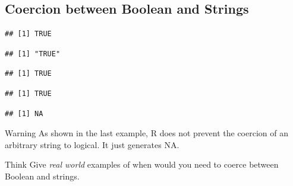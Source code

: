 \subsection{Coercion between Boolean and Strings}
\begin{knitrout}
\color{fgcolor}\begin{kframe}
\begin{alltt}
\hlstd{(}\hlstd{)} 
\end{alltt}
\begin{verbatim}
## [1] TRUE
\end{verbatim}
\begin{alltt}
\hlstd{(}\hlstd{)} 
\end{alltt}
\begin{verbatim}
## [1] "TRUE"
\end{verbatim}
\begin{alltt}
\hlstd{(}\hlstd{)}  
\end{alltt}
\begin{verbatim}
## [1] TRUE
\end{verbatim}
\begin{alltt}
\hlstd{(}\hlstd{)} 
\end{alltt}
\begin{verbatim}
## [1] TRUE
\end{verbatim}
\begin{alltt}
\hlstd{(}\hlstd{)} 
\end{alltt}
\begin{verbatim}
## [1] NA
\end{verbatim}
\end{kframe}
\end{knitrout}
\begin{DIY}{Warning}
As shown in the last example, R does not prevent the coercion of an arbitrary string to logical. It just generates NA. 
\end{DIY}

\begin{DIY}{Think}
Give \emph{real world} examples of when would you need to coerce between Boolean and strings.
\end{DIY}
